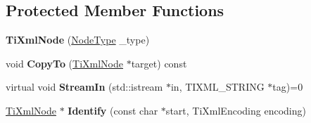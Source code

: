 \subsection*{Protected Member Functions}
\begin{DoxyCompactItemize}
\item 
\hypertarget{class_ti_xml_node_a3f46721695868667113c7487ff123f20}{}\label{class_ti_xml_node_a3f46721695868667113c7487ff123f20} 
{\bfseries Ti\+Xml\+Node} (\hyperlink{class_ti_xml_node_a836eded4920ab9e9ef28496f48cd95a2}{Node\+Type} \+\_\+type)
\item 
\hypertarget{class_ti_xml_node_aaadd5bb9c94f84c4472b649b95de4a0b}{}\label{class_ti_xml_node_aaadd5bb9c94f84c4472b649b95de4a0b} 
void {\bfseries Copy\+To} (\hyperlink{class_ti_xml_node}{Ti\+Xml\+Node} $\ast$target) const
\item 
\hypertarget{class_ti_xml_node_ab4b4af1a6b486dcbc0e327cf291270af}{}\label{class_ti_xml_node_ab4b4af1a6b486dcbc0e327cf291270af} 
virtual void {\bfseries Stream\+In} (std\+::istream $\ast$in, T\+I\+X\+M\+L\+\_\+\+S\+T\+R\+I\+NG $\ast$tag)=0
\item 
\hypertarget{class_ti_xml_node_ac1e3a8e7578be463b04617786120c2bb}{}\label{class_ti_xml_node_ac1e3a8e7578be463b04617786120c2bb} 
\hyperlink{class_ti_xml_node}{Ti\+Xml\+Node} $\ast$ {\bfseries Identify} (const char $\ast$start, Ti\+Xml\+Encoding encoding)
\end{DoxyCompactItemize}
